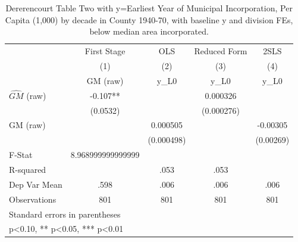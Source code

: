 \begin{table}[htbp]\centering
\def\sym#1{\ifmmode^{#1}\else\(^{#1}\)\fi}
\caption{Dererencourt Table Two with y=Earliest Year of Municipal Incorporation, Per Capita (1,000) by decade in County 1940-70, with baseline y and division FEs, below median area incorporated.}
\begin{tabular}{l*{4}{c}}
\toprule
                    & First Stage   &         OLS   &Reduced Form   &        2SLS   \\
                    &\multicolumn{1}{c}{(1)}&\multicolumn{1}{c}{(2)}&\multicolumn{1}{c}{(3)}&\multicolumn{1}{c}{(4)}\\
                    &\multicolumn{1}{c}{GM  (raw)}&\multicolumn{1}{c}{y\_L0}&\multicolumn{1}{c}{y\_L0}&\multicolumn{1}{c}{y\_L0}\\
\midrule
$\hat{GM}$ (raw)    &      -0.107** &               &    0.000326   &               \\
                    &    (0.0532)   &               &  (0.000276)   &               \\
\addlinespace
GM  (raw)           &               &    0.000505   &               &    -0.00305   \\
                    &               &  (0.000498)   &               &   (0.00269)   \\
\midrule
F-Stat              &8.968999999999999   &               &               &               \\
R-squared           &               &        .053   &        .053   &               \\
Dep Var Mean        &        .598   &        .006   &        .006   &        .006   \\
Observations        &         801   &         801   &         801   &         801   \\
\bottomrule
\multicolumn{5}{l}{\footnotesize Standard errors in parentheses}\\
\multicolumn{5}{l}{\footnotesize * p<0.10, ** p<0.05, *** p<0.01}\\
\end{tabular}
\end{table}
